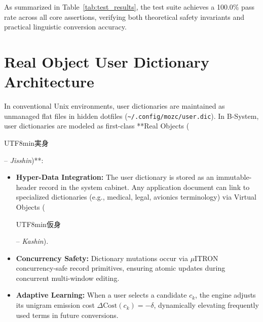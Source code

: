 \documentclass[10pt,journal,compsoc,twocolumn]{article}
\newcommand{\ja}[1]{\begin{CJK*}{UTF8}{min}#1\end{CJK*}}
\begin{document}
\begin{table}[htbp]
\centering
\caption{B-System/mozc Automated Unit Test Results}
\label{tab:test_results}
\end{table}

As summarized in Table~\ref{tab:test_results}, the test suite achieves a 100.0\% pass rate across all core assertions, verifying both theoretical safety invariants and practical linguistic conversion accuracy.

\section{Real Object User Dictionary Architecture}
\label{sec:real_objects}

In conventional Unix environments, user dictionaries are maintained as unmanaged flat files in hidden dotfiles (\texttt{\textasciitilde/.config/mozc/user.dic}). In B-System, user dictionaries are modeled as first-class **Real Objects (\ja{実身} -- \emph{Jisshin})**:
\begin{itemize}[leftmargin=*]
    \item \textbf{Hyper-Data Integration:} The user dictionary is stored as an immutable-header record in the system cabinet. Any application document can link to specialized dictionaries (e.g., medical, legal, avionics terminology) via Virtual Objects (\ja{仮身} -- \emph{Kashin}).
    \item \textbf{Concurrency Safety:} Dictionary mutations occur via $\mu$ITRON concurrency-safe record primitives, ensuring atomic updates during concurrent multi-window editing.
    \item \textbf{Adaptive Learning:} When a user selects a candidate $c_k$, the engine adjusts its unigram emission cost $\Delta \text{Cost}(c_k) = -\delta$, dynamically elevating frequently used terms in future conversions.
\end{itemize}
\end{document}
